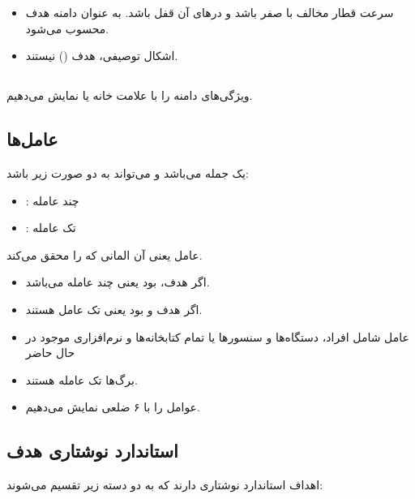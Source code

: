 \begin{itemize}
    \item سرعت قطار مخالف با صفر باشد و در‌های آن قفل باشد. به عنوان دامنه هدف
    محسوب می‌شود.
    \item اشکال توصیفی، هدف () نیستند.
\end{itemize}

\subsection{}

ویژگی‌های دامنه را با علامت خانه یا  نمایش می‌دهیم.

\subsection{عامل‌ها}

 یک جمله می‌باشد و می‌تواند به دو صورت زیر باشد:

\begin{itemize}
    \item {}: چند عامله
    \item {}: تک عامله
\end{itemize}

عامل یعنی آن المانی که  را محقق می‌کند.

\begin{itemize}
    \item اگر هدف،  بود یعنی چند عامله می‌باشد.
    \item اگر هدف  و  بود یعنی تک
    عامل هستند.
\end{itemize}

\begin{itemize}
    \item عامل شامل افراد، دستگاه‌ها و سنسور‌ها یا تمام کتابخانه‌ها و نرم‌افزاری
    موجود در حال حاضر
    \item برگ‌ها تک عامله هستند.
    \item عوامل را با ۶ ضلعی نمایش می‌دهیم.
\end{itemize}

\subsection{استاندارد نوشتاری هدف}

اهداف استاندارد نوشتاری دارند که به دو دسته زیر تقسیم می‌شوند:

